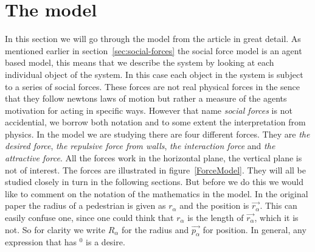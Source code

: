 


\section{The model}
\label{sec:the-model}
In this section we will go through the model from the article \cite{self-org} 
in great detail. As mentioned earlier in section~\ref{sec:social-forces} the 
social force model is an agent based model, this means that we describe the 
system by looking at each individual object of the system. In this case each 
object in the system is subject to a series of social forces. These forces 
are not real physical forces in the sence that they follow newtons laws of 
motion but rather a measure of the agents motivation for acting in specific 
ways. However that name \emph{social forces} is not accidential, we borrow 
both notation and to some extent the interpretation from physics. In the model 
we are studying there are four different forces. They are \emph{the desired force}, 
\emph{the repulsive force from walls}, \emph{the interaction force} and \emph{the 
attractive force}. All the forces work in the horizontal plane, the vertical 
plane is not of interest. The forces are illustrated in 
figure~\ref{ForceModel}.  They will all be studied closely in turn in the 
following sections.  But before we do this we would like to comment on the 
notation of the mathematics in the model. In the original paper the radius of a pedestrian is given as $r_{\alpha}$ and the position is $\vec{r_{\alpha}}$. This can easily confuse one, since one could think that $r_{\alpha}$ is the length of $\vec{r_{\alpha}}$, which it is not. So for clarity we write $R_{\alpha}$ for the radius and $\vec{p_{\alpha}}$ for position. In general, 
any expression that has $^{0}$ is a desire. 

